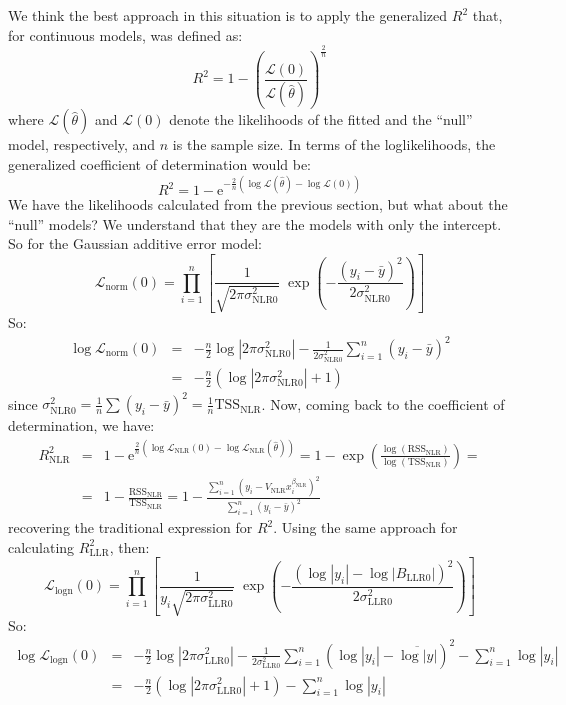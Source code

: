 \documentclass[12pt,oneside,letterpaper]{article}
\begin{document}
We think the best approach in this situation is to apply the generalized $R^2$ that, for continuous models, was defined as\cite{genR2}:
$$ R^2 = 1 - \left(\frac{\mathcal{L}(0)}{\mathcal{L}(\hat\theta)}\right)^{\!\!\frac{2}{n}} $$
where $\mathcal{L}(\hat\theta)$ and $\mathcal{L}(0)$  denote the likelihoods of the fitted and the ``null'' model, respectively, and $n$ is the sample size. In terms of the loglikelihoods, the generalized coefficient of determination would be:
$$ R^2 = 1 - \mathrm{e}^{-\frac{2}{n}\left(\log\mathcal{L}(\hat\theta)-\log\mathcal{L}(0)\right)} $$
We have the likelihoods calculated from the previous section, but what about the ``null'' models? We understand that they are the models with only the intercept. So for the Gaussian additive error model:
$$\mathcal{L}_\text{norm}(0) = \prod_{i=1}^n\left[\frac{1}{\sqrt{2\pi\sigma^2_\text{NLR0}}}\;\exp{\left(-\frac{\left(y_i-\bar y\right)^2}{2\sigma^2_\text{NLR0}}\right)}\right]$$
So:
\begin{eqnarray*}
\log\mathcal{L}_\text{norm}(0) &=& -\frac{n}{2}\log\left|2\pi\sigma^2_\text{NLR0}\right| - \frac{1}{2\sigma^2_\text{NLR0}}\sum_{i=1}^n\left(y_i-\bar y\right)^2\\
 &=& -\frac{n}{2}\left(\log\left|2\pi\sigma^2_\text{NLR0}\right| + 1 \right)
\end{eqnarray*}
since $\sigma^2_\text{NLR0}=\frac{1}{n}\sum\left(y_i-\bar y\right)^2=\frac{1}{n}\mathrm{TSS}_\text{NLR}$. Now, coming back to the coefficient of determination, we have:
\begin{eqnarray*}
R^2_\text{NLR} &=& 1 - \mathrm{e}^{\frac{2}{n}\left(\log\mathcal{L}_\text{NLR}(0)-\log\mathcal{L}_\text{NLR}(\hat\theta)\right)} = 1 - \exp{\left(\frac{\log(\mathrm{RSS}_\text{NLR})}{\log(\mathrm{TSS}_\text{NLR})}\right)}
 =\\ &=& 1 - \frac{\mathrm{RSS}_\text{NLR}}{\mathrm{TSS}_\text{NLR}} =
 1 - \frac{\sum_{i=1}^n\left(y_i-V_\text{NLR}x_i^{\beta_\text{NLR}}\right)^2}{\sum_{i=1}^n\left(y_i-\bar y\right)^2}
\end{eqnarray*}
recovering the traditional expression for $R^2$. Using the same approach for calculating $R^2_\text{LLR}$, then:
$$\mathcal{L}_\text{logn}(0) = \prod_{i=1}^n\left[\frac{1}{y_i\sqrt{2\pi\sigma^2_\text{LLR0}}}\;\exp{\left(-\frac{\left(\log|y_i|-\log|B_\text{LLR0}|\right)^2}{2\sigma^2_\text{LLR0}}\right)}\right]$$
So:
\begin{eqnarray*}
\log\mathcal{L}_\text{logn}(0) &=& -\frac{n}{2}\log\left|2\pi\sigma^2_\text{LLR0}\right| - \frac{1}{2\sigma^2_\text{LLR0}}\sum_{i=1}^n\left(\log|y_i|-\overline{\log|y|}\right)^2 - \sum_{i=1}^n\log|y_i|\\
 &=& -\frac{n}{2}\left(\log\left|2\pi\sigma^2_\text{LLR0}\right| + 1 \right) - \sum_{i=1}^n\log|y_i|
\end{eqnarray*}
\end{document}

